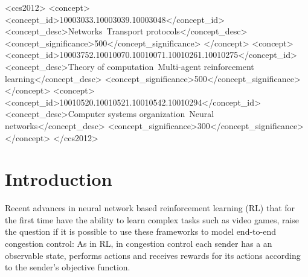\documentclass[newfonts=false,format=sigconf,10pt,letterpaper]{acmart}
\begin{document}
%
%
\begin{CCSXML}
<ccs2012>
<concept>
<concept_id>10003033.10003039.10003048</concept_id>
<concept_desc>Networks~Transport protocols</concept_desc>
<concept_significance>500</concept_significance>
</concept>
<concept>
<concept_id>10003752.10010070.10010071.10010261.10010275</concept_id>
<concept_desc>Theory of computation~Multi-agent reinforcement learning</concept_desc>
<concept_significance>500</concept_significance>
</concept>
<concept>
<concept_id>10010520.10010521.10010542.10010294</concept_id>
<concept_desc>Computer systems organization~Neural networks</concept_desc>
<concept_significance>300</concept_significance>
</concept>
</ccs2012>
\end{CCSXML}




\maketitle%

\section{Introduction}

Recent advances in neural network based reinforcement learning (RL) that for the first time have the ability to learn complex tasks such as video games, raise the question if it is possible to use these frameworks to model end-to-end congestion control: As in RL, in congestion control each sender has a an observable state, performs actions and receives rewards for its actions according to the sender's objective function.
\end{document}
